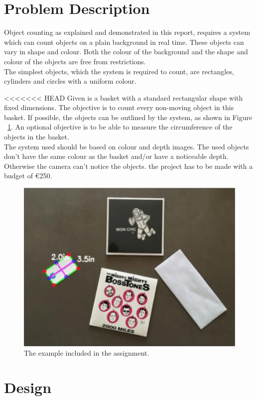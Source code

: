 \documentclass[11pt]{article}
\begin{document}
\section{Problem Description}

\hspace{\parindent} Object counting as explained and demonstrated in this report, requires a system which can count objects on a plain background in real time. These objects can vary in shape and colour. Both the colour of the background and the shape and colour of the objects are free from restrictions.\\
The simplest objects, which the system is required to count, are rectangles, cylinders and circles with a uniform colour.

<<<<<<< HEAD
\noindent Given is a basket with a standard rectangular shape with fixed dimensions. The objective is to count every non-moving object in this basket. If possible, the objects can be outlined by the system, as shown in Figure ~\ref{fig:example}. An optional objective is to be able to measure the circumference of the objects in the basket.\\

\noindent The system used should be based on colour and depth images. The used objects don't have the same colour as the basket and/or have a noticeable depth. Otherwise the camera can't notice the objects. the project has to be made with a budget of \euro 250.\\

\begin{figure}[h!]
\centering
  \includegraphics[width=0.7\linewidth]{opdracht.png}
  \caption{The example included in the assignment.}
  \label{fig:example}
\end{figure}



\section{Design}
\end{document}
